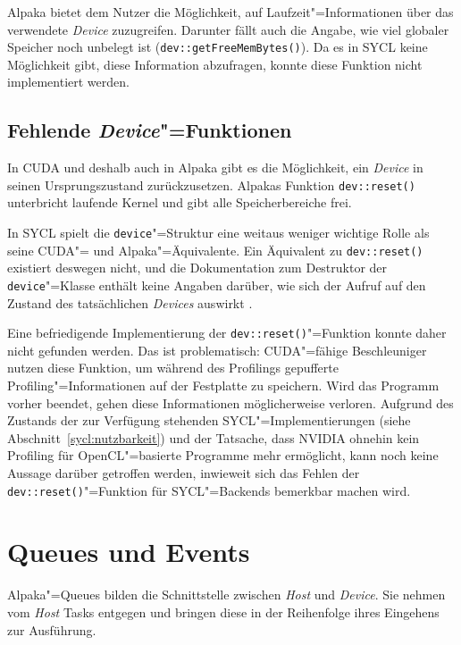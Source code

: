 Alpaka bietet dem Nutzer die Möglichkeit, auf Laufzeit"=Informationen über das
verwendete \textit{Device} zuzugreifen. Darunter fällt auch die Angabe, wie viel
globaler Speicher noch unbelegt ist (\texttt{dev::getFreeMemBytes()}). Da es in
SYCL keine Möglichkeit gibt, diese Information abzufragen, konnte diese Funktion
nicht implementiert werden.

\subsection{Fehlende \textit{Device}"=Funktionen}

In CUDA und deshalb auch in Alpaka gibt es die Möglichkeit, ein \textit{Device}
in seinen Ursprungszustand zurückzusetzen. Alpakas Funktion
\texttt{dev::reset()} unterbricht laufende Kernel und gibt alle Speicherbereiche
frei. 

In SYCL spielt die \texttt{device}"=Struktur eine weitaus weniger wichtige
Rolle als seine CUDA"= und Alpaka"=Äquivalente. Ein Äquivalent zu
\texttt{dev::reset()} existiert deswegen nicht, und die Dokumentation zum
Destruktor der \texttt{device}"=Klasse enthält keine Angaben darüber, wie sich
der Aufruf auf den Zustand des tatsächlichen \textit{Devices} auswirkt
\cite[vgl.][33,41,58]{sycl2019}.

Eine befriedigende Implementierung der \texttt{dev::reset()}"=Funktion konnte
daher nicht gefunden werden. Das ist problematisch: CUDA"=fähige Beschleuniger
nutzen diese Funktion, um während des Profilings gepufferte
Profiling"=Informationen auf der Festplatte zu speichern. Wird das Programm
vorher beendet, gehen diese Informationen möglicherweise verloren. Aufgrund des
Zustands der zur Verfügung stehenden SYCL"=Implementierungen (siehe
Abschnitt~\ref{sycl:nutzbarkeit}) und der Tatsache, dass NVIDIA ohnehin kein
Profiling für OpenCL"=basierte Programme mehr ermöglicht, kann noch keine
Aussage darüber getroffen werden, inwieweit sich das Fehlen der
\texttt{dev::reset()}"=Funktion für SYCL"=Backends bemerkbar machen wird.

\section{Queues und Events}
\label{implementierung:queue}

Alpaka"=Queues bilden die Schnittstelle zwischen \textit{Host} und
\textit{Device}. Sie nehmen vom \textit{Host} Tasks entgegen und bringen diese
in der Reihenfolge ihres Eingehens zur Ausführung.

